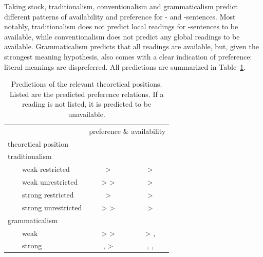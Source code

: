 \documentclass[fleqn,reqno,10pt,draft]{article}
\newcommand{\lit}{\acro{lit}}
\newcommand{\glb}{\acro{glb}}
\newcommand{\loc}{\acro{loc}}
\newcommand{\as}{\acro{as}}
\renewcommand{\es}{\acro{es}}
\begin{document}
\medskip

Taking stock, traditionalism, conventionalism and grammaticalism
predict different patterns of availability and preference for \as- and
\es-sentences. Most notably, traditionalism does not predict local
readings for \es-sentences to be available, while conventionalism does
not predict any global readings to be available. Grammaticalism
predicts that all readings are available, but, given the strongest
meaning hypothesis, also comes with a clear indication of preference:
literal meanings are dispreferred. All predictions are summarized in
Table~\ref{tab:predictions}.


\begin{table}[t]
  \centering
  \begin{tabular}{lcc}
    & \multicolumn{2}{c}{preference \& availability}
    \\ \cmidrule(r){2-3}
    theoretical position
    & \as
    & \es
    \\ \midrule
    traditionalism
    \\
    \ \ \ \ weak restricted 
    & \lit > \glb 
    & \lit > \glb
    \\
    \ \ \ \ weak unrestricted
    & \lit > \glb > \loc 
    & \lit > \glb
    \\
    \ \ \ \ strong restricted
    & \glb > \lit 
    & \glb > \lit
    \\
    \ \ \ \ strong unrestricted
    & \glb > \loc > \lit 
    & \glb > \lit
    \\
    grammaticalism
    \\
    \ \ \ \ weak
    & \loc > \glb > \lit 
    & \glb > \lit, \loc
    \\
    \ \ \ \ strong
    & \glb, \loc > \lit 
    & \glb, \loc , \lit
    \\
  \end{tabular}
  \caption{Predictions of the relevant theoretical positions. Listed
    are the predicted preference relations. If a reading is not
    listed, it is predicted to be unavailable.}
  \label{tab:predictions}
\end{table}
\end{document}
